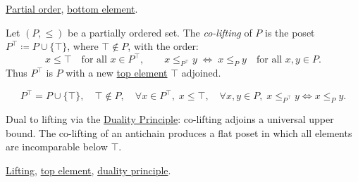 \begin{remark*}[Dependencies]
\hyperref[def:lattice-order-partial-order]{Partial order},
\hyperref[def:bottom-element]{bottom element}.
\end{remark*}


\begin{definition}[Co-Lifting]
\label{def:co-lifting}
Let $(P, \leq)$ be a partially ordered set.  The \emph{co-lifting} of $P$
is the poset $P^{\top} \coloneqq P \cup \{\top\}$, where $\top \notin P$,
with the order:
\[
x \leq \top \quad \text{for all } x \in P^{\top},
\qquad
x \leq_{P^{\top}} y \;\Longleftrightarrow\; x \leq_P y
\quad \text{for all } x, y \in P.
\]
Thus $P^{\top}$ is $P$ with a new
\hyperref[def:top-element]{top element} $\top$ adjoined.
\end{definition}

\begin{remark*}
\[
P^{\top} = P \cup \{\top\},\quad
\top \notin P,\quad
\forall x \in P^{\top},\; x \leq \top,\quad
\forall x,y \in P,\; x \leq_{P^\top} y \Leftrightarrow x \leq_P y.
\]
\end{remark*}

\begin{remark*}[Interpretation]
Dual to lifting via the
\hyperref[prop:duality-principle]{Duality Principle}: co-lifting adjoins
a universal upper bound.  The co-lifting of an antichain produces a flat
poset in which all elements are incomparable below $\top$.
\end{remark*}

\begin{remark*}[Dependencies]
\hyperref[def:lifting]{Lifting},
\hyperref[def:top-element]{top element},
\hyperref[prop:duality-principle]{duality principle}.
\end{remark*}
